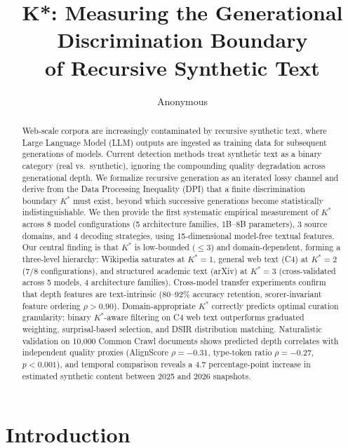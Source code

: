 \documentclass[11pt,a4paper]{article}
\title{K*: Measuring the Generational Discrimination Boundary\\of Recursive Synthetic Text}
\author{Anonymous}
\date{}
\begin{document}
\maketitle

\begin{abstract}
Web-scale corpora are increasingly contaminated by recursive synthetic text, where Large Language Model (LLM) outputs are ingested as training data for subsequent generations of models. Current detection methods treat synthetic text as a binary category (real vs.\ synthetic), ignoring the compounding quality degradation across generational depth. We formalize recursive generation as an iterated lossy channel and derive from the Data Processing Inequality (DPI) that a finite discrimination boundary $K^*$ must exist, beyond which successive generations become statistically indistinguishable. We then provide the first systematic empirical measurement of $K^*$ across 8 model configurations (5 architecture families, 1B--8B parameters), 3 source domains, and 4 decoding strategies, using 15-dimensional model-free textual features. Our central finding is that $K^*$ is low-bounded ($\leq 3$) and domain-dependent, forming a three-level hierarchy: Wikipedia saturates at $K^*{=}1$, general web text (C4) at $K^*{=}2$ (7/8 configurations), and structured academic text (arXiv) at $K^*{=}3$ (cross-validated across 5 models, 4 architecture families). Cross-model transfer experiments confirm that depth features are text-intrinsic (80--92\% accuracy retention, scorer-invariant feature ordering $\rho{>}0.90$). Domain-appropriate $K^*$ correctly predicts optimal curation granularity: binary $K^*$-aware filtering on C4 web text outperforms graduated weighting, surprisal-based selection, and DSIR distribution matching. Naturalistic validation on 10,000 Common Crawl documents shows predicted depth correlates with independent quality proxies (AlignScore $\rho{=}{-}0.31$, type-token ratio $\rho{=}{-}0.27$, $p{<}0.001$), and temporal comparison reveals a 4.7 percentage-point increase in estimated synthetic content between 2025 and 2026 snapshots.
\end{abstract}


\section{Introduction}
\end{document}
